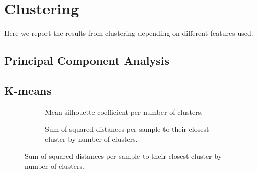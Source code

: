 %


\section{Clustering}
Here we report the results from clustering depending on different features used.



\subsection{Principal Component Analysis}


\subsection{K-means}

\begin{figure}
	\begin{subfigure}[b]{\textwidth}
		
		\caption{Mean silhouette coefficient per number of clusters.}
	\end{subfigure}
	\begin{subfigure}[b]{\textwidth}
		
		\caption{Sum of squared distances per sample to their closest cluster by number of clusters.}
	\end{subfigure}
\end{figure}

